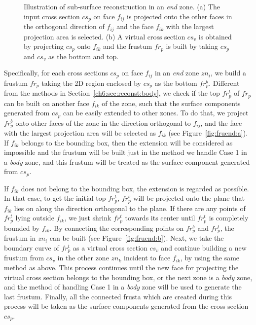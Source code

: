 \begin{figure} [htbp]
{\begin{minipage}[b]{0.4\textwidth}
    \end{minipage}}
  \caption{Illustration of sub-surface reconstruction in an \textit{end} zone.
  (a) The input cross section $cs_p$ on face $f_{ij}$ is projected onto the other faces in the orthogonal direction of $f_{ij}$ and the face $f_{ik}$ with the largest projection area is selected.
  (b) A virtual cross section $cs_v$ is obtained by projecting $cs_p$ onto $f_{ik}$ and the frustum $fr_p$ is built by taking $cs_p$ and $cs_v$ as the bottom and top. }
  \label{fig:fruend}
\end{figure}

Specifically, for  each cross sections $cs_p$ on face $f_{ij}$ in an
\textit{end} zone $zn_i$, we build a frustum $fr_p$ taking the 2D
region enclosed by $cs_p$ as the bottom $fr_p^b$. Different from the
methods in Section~\ref{ch6:sec:reconst:body}, we check if the top
$fr_p^t$ of $fr_p$ can be built on another face $f_{ik}$ of the
zone, such that the surface components generated from $cs_p$ can be
easily extended to other zones. To do that, we project $fr_p^b$ onto
other faces of the zone in the direction orthogonal to $f_{ij}$, and
the face with the largest projection area will be selected as
$f_{ik}$ (see Figure~\ref{fig:fruend:a}). If $f_{ik}$ belongs to the
bounding box, then the extension will be considered as impossible
and the frustum will be built just in the method we handle Case 1 in
a \textit{body} zone, and this frustum will be treated as the
surface component generated from $cs_p$.

If $f_{ik}$ does not belong to the bounding box, the extension is
regarded as possible. In that case, to get the initial top $fr_p^t$,
$fr_p^b$ will be projected onto the plane that $f_{ik}$ lies on
along the direction orthogonal to the plane. If there are any points
of $fr_p^t$ lying outside $f_{ik}$, we just shrink $fr_p^t$ towards
its center until $fr_p^t$ is completely bounded by $f_{ik}$. By
connecting the corresponding points on $fr_p^b$ and $fr_p^t$, the
frustum in $zn_i$ can be built (see Figure~\ref{fig:fruend:b}).
Next, we take the boundary curve of $fr_p^t$ as a virtual cross
section $cs_v$ and continue building a new frustum from $cs_v$ in
the other zone $zn_k$ incident to face $f_{ik}$, by using the same
method as above. This process continues until the new face for
projecting the virtual cross section belongs to the bounding box, or
the next zone is a \textit{body} zone, and the method of handling
Case 1 in a \textit{body} zone will be used to generate the last
frustum. Finally, all the connected frusta which are created during
this process will be taken as the surface components generated from
the cross section $cs_p$.


